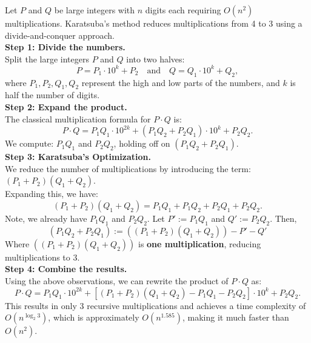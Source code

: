 \begin{Proof}

    Let \( P \) and \( Q \) be large integers with \( n \) digits each requiring \( O(n^2) \) multiplications. Karatsuba’s method reduces multiplications from 4 to 3 using a divide-and-conquer approach.\\

    \noindent
    \textbf{Step 1: Divide the numbers.} \\
    Split the large integers \( P \) and \( Q \) into two halves:
    \[
    P = P_1 \cdot 10^k + P_2 \quad \text{and} \quad Q = Q_1 \cdot 10^k + Q_2,
    \]
    where \( P_1, P_2, Q_1, Q_2 \) represent the high and low parts of the numbers, and \( k \) is half the number of digits.\\

    \noindent
    \textbf{Step 2: Expand the product.} \\
    The classical multiplication formula for \( P \cdot Q \) is:
    \[
    P \cdot Q = P_1 Q_1 \cdot 10^{2k} + (P_1 Q_2 + P_2 Q_1) \cdot 10^k + P_2 Q_2.
    \]
    We compute: \( P_1 Q_1 \) and \( P_2 Q_2 \), holding off on $(P_1 Q_2 + P_2 Q_1)$.\\

    \noindent
    \textbf{Step 3: Karatsuba’s Optimization.} \\
    We reduce the number of multiplications by introducing the term: $ (P_1 + P_2)(Q_1 + Q_2)$.\\
    Expanding this, we have:
    \[
    (P_1 + P_2)(Q_1 + Q_2) = P_1 Q_1 + P_1 Q_2 + P_2 Q_1 + P_2 Q_2.
    \]
    Note, we already have \( P_1 Q_1 \) and \( P_2 Q_2 \). Let $P':= P_1 Q_1$ and $Q':= P_2 Q_2$. Then,
    \[
        (P_1 Q_2 + P_2 Q_1):= ((P_1 + P_2)(Q_1 + Q_2))-P'-Q'
    \]
    Where $((P_1 + P_2)(Q_1 + Q_2))$ is \textbf{one multiplication}, reducing multiplications to 3.\\
    

    \noindent
    \textbf{Step 4: Combine the results.} \\
    Using the above observations, we can rewrite the product of \( P \cdot Q \) as:
    \[
    P \cdot Q = P_1 Q_1 \cdot 10^{2k} + \left[ (P_1 + P_2)(Q_1 + Q_2) - P_1 Q_1 - P_2 Q_2 \right] \cdot 10^k + P_2 Q_2.
    \]
    This results in only 3 recursive multiplications and achieves a time complexity of \( O(n^{\log_2 3}) \), which is approximately \( O(n^{1.585}) \), making it much faster than \( O(n^2) \).

\end{Proof}
